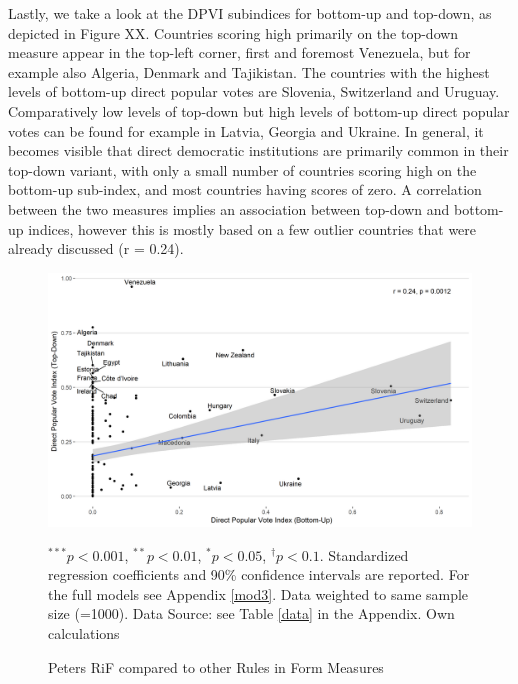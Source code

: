 \documentclass{systats}
\begin{document}
Lastly, we take a look at the DPVI subindices for bottom-up and top-down, as depicted in Figure XX. Countries scoring high primarily on the top-down measure appear in the top-left corner, first and foremost Venezuela, but for example also Algeria, Denmark and Tajikistan. The countries with the highest levels of bottom-up direct popular votes are Slovenia, Switzerland and Uruguay. Comparatively low levels of top-down but high levels of bottom-up direct popular votes can be found for example in Latvia, Georgia and Ukraine. In general, it becomes visible that direct democratic institutions are primarily common in their top-down variant, with only a small number of countries scoring high on the bottom-up sub-index, and most countries having scores of zero. A correlation between the two measures implies an association between top-down and bottom-up indices, however this is mostly based on a few outlier countries that were already discussed (r = 0.24). 


\begin{figure}
	\caption{Peters RiF compared to other Rules in Form Measures}
	\label{reg2}
	\includegraphics[width=\textwidth]{images/altman_tpbu.png}
	\flushright
	{\scriptsize $^{***}p<0.001$, $^{**}p<0.01$, $^*p<0.05$, $^{\dagger}p<0.1$. Standardized regression coefficients and 90\% confidence intervals are reported. For the full models see Appendix \ref{mod3}. Data weighted to same sample size (=1000). Data Source: see Table \ref{data} in the Appendix. Own calculations  \par}
\end{figure}

\end{document}

